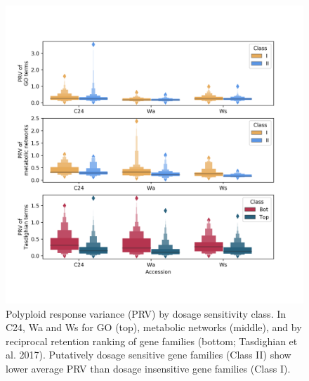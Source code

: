 \documentclass[11pt]{article}
\begin{document}
{\begin{figure}[h!]
    \includegraphics[width=\linewidth]{../figures/all_prv_boxen.png}
 \caption{Polyploid response variance (PRV) by dosage sensitivity class. In C24, Wa and Ws for GO (top), metabolic networks (middle), and by reciprocal retention ranking of gene families (bottom; Tasdighian et al. 2017). Putatively dosage sensitive gene families (Class II) show lower average PRV than dosage insensitive gene families (Class I).}
  \label{fig3}
\end{figure}

}
\end{document}
